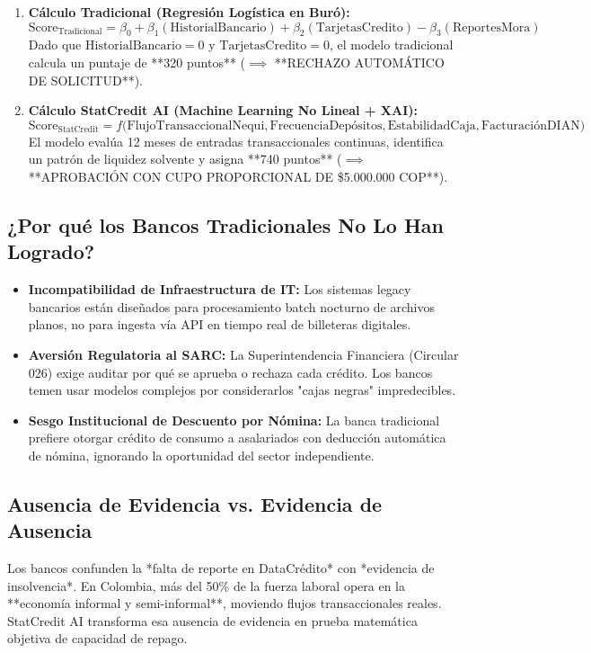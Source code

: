 \documentclass[11pt,a4paper]{article}
\begin{document}
\begin{enumerate}[leftmargin=*]
    \item \textbf{Cálculo Tradicional (Regresión Logística en Buró):}
    $$\text{Score}_{\text{Tradicional}} = \beta_0 + \beta_1(\text{HistorialBancario}) + \beta_2(\text{TarjetasCredito}) - \beta_3(\text{ReportesMora})$$
    Dado que $\text{HistorialBancario} = 0$ y $\text{TarjetasCredito} = 0$, el modelo tradicional calcula un puntaje de **320 puntos** ($\implies$ **RECHAZO AUTOMÁTICO DE SOLICITUD**).
    \item \textbf{Cálculo StatCredit AI (Machine Learning No Lineal + XAI):}
    $$\text{Score}_{\text{StatCredit}} = f\big(\text{FlujoTransaccionalNequi}, \text{FrecuenciaDepósitos}, \text{EstabilidadCaja}, \text{FacturaciónDIAN}\big)$$
    El modelo evalúa 12 meses de entradas transaccionales continuas, identifica un patrón de liquidez solvente y asigna **740 puntos** ($\implies$ **APROBACIÓN CON CUPO PROPORCIONAL DE \$5.000.000 COP**).
\end{enumerate}

\subsection{¿Por qué los Bancos Tradicionales No Lo Han Logrado?}
\begin{itemize}[leftmargin=*]
    \item \textbf{Incompatibilidad de Infraestructura de IT:} Los sistemas legacy bancarios están diseñados para procesamiento batch nocturno de archivos planos, no para ingesta vía API en tiempo real de billeteras digitales.
    \item \textbf{Aversión Regulatoria al SARC:} La Superintendencia Financiera (Circular 026) exige auditar por qué se aprueba o rechaza cada crédito. Los bancos temen usar modelos complejos por considerarlos "cajas negras" impredecibles.
    \item \textbf{Sesgo Institucional de Descuento por Nómina:} La banca tradicional prefiere otorgar crédito de consumo a asalariados con deducción automática de nómina, ignorando la oportunidad del sector independiente.
\end{itemize}

\subsection{Ausencia de Evidencia vs. Evidencia de Ausencia}
Los bancos confunden la *falta de reporte en DataCrédito* con *evidencia de insolvencia*. En Colombia, más del 50\% de la fuerza laboral opera en la **economía informal y semi-informal**, moviendo flujos transaccionales reales. StatCredit AI transforma esa ausencia de evidencia en prueba matemática objetiva de capacidad de repago.
\end{document}
